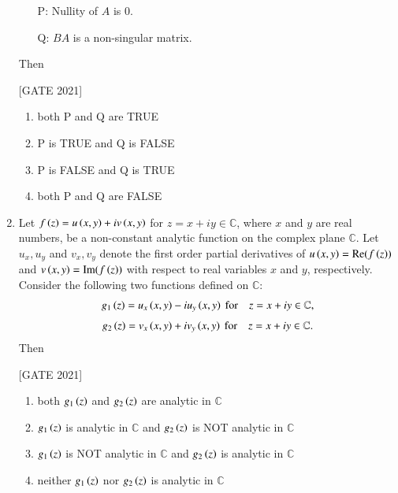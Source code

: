 \documentclass[journal,12pt,onecolumn]{IEEEtran}
\theoremstyle{remark}
\begin{document}
\begin{enumerate}
\begin{enumerate}
    \item[P:] Nullity of $ A $ is 0.
    \item[Q:] $ BA $ is a non-singular matrix.
\end{enumerate}

 Then

\hfill{[GATE 2021]}\begin{multicols}{2}
    \begin{enumerate}
        \item both P and Q are TRUE
        \item P is TRUE and Q is FALSE
        \item P is FALSE and Q is TRUE
        \item both P and Q are FALSE
    \end{enumerate}
\end{multicols}  
\item Let $ f\left(z\right) = u\left(x,y\right) + i  v\left(x,y\right) $ for $ z = x + i y \in \mathbb{C} $, where $ x $ and $ y $ are real numbers, be a non-constant analytic function on the complex plane $ \mathbb{C} $. Let $ u_x, u_y $ and $ v_x, v_y $ denote the first order partial derivatives of $ u\left(x,y\right) = \operatorname{Re}(f\left(z\right)) $ and $ v\left(x,y\right) = \operatorname{Im}(f\left(z\right)) $ with respect to real variables $ x $ and $ y $, respectively. Consider the following two functions defined on $ \mathbb{C} $:
\begin{align*}
       g_1\left(z\right) = u_x\left(x,y\right) - i u_y\left(x,y\right) \text{ for} \quad z = x + iy \in \mathbb{C},
\end{align*}
\begin{align*}g_2\left(z\right) = v_x\left(x,y\right) + i v_y\left(x,y\right)   
\text{ for} \quad z = x + iy \in \mathbb{C}.
\end{align*}
Then

\hfill{[GATE 2021]}

    \begin{enumerate}
        \item both $ g_1\left(z\right) $ and $ g_2\left(z\right) $ are analytic in $ \mathbb{C} $
        \item $ g_1\left(z\right) $ is analytic in $ \mathbb{C} $ and $ g_2\left(z\right) $ is NOT analytic in $ \mathbb{C} $
        \item $ g_1\left(z\right) $ is NOT analytic in $ \mathbb{C} $ and $ g_2\left(z\right) $ is analytic in $ \mathbb{C} $\item neither $ g_1\left(z\right) $ nor $ g_2\left(z\right) $ is analytic in $ \mathbb{C} $
    \end{enumerate}




\end{enumerate}
\end{document}
